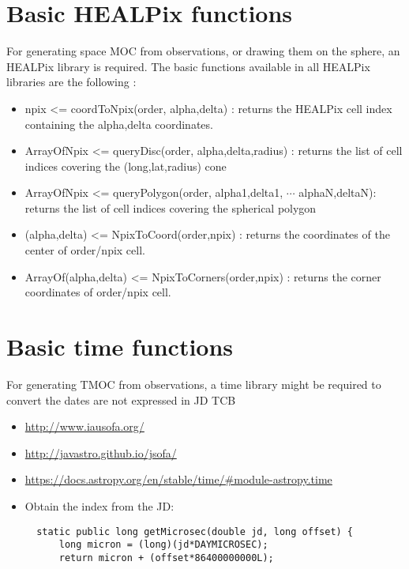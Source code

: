 \section{Basic HEALPix functions}
For generating space MOC from observations, or drawing them on the
sphere, an HEALPix library is required. The basic functions available
in all HEALPix libraries are the following :
\begin{itemize}
   \item npix <= coordToNpix(order, alpha,delta) : returns the HEALPix
     cell index containing the alpha,delta coordinates.
   \item ArrayOfNpix <= queryDisc(order, alpha,delta,radius) : returns
     the list of cell indices covering the (long,lat,radius) cone
   \item ArrayOfNpix <= queryPolygon(order, alpha1,delta1, $\cdots$
     alphaN,deltaN): returns the list of cell indices covering the
     spherical polygon
   \item (alpha,delta) <= NpixToCoord(order,npix) : returns the
     coordinates of the center of order/npix cell.
   \item ArrayOf(alpha,delta) <= NpixToCorners(order,npix) : returns
     the corner coordinates of order/npix cell.
\end{itemize}

\section{Basic time functions} 
For generating TMOC from observations, a time library might be required to convert the dates are not expressed in JD TCB
\begin{itemize} 
\item \url{http://www.iausofa.org/}
\item \url{http://javastro.github.io/jsofa/}
\item \url{https://docs.astropy.org/en/stable/time/#module-astropy.time}
\item Obtain the index from the JD: 
\begin{Verbatim}
  static public long getMicrosec(double jd, long offset) {
      long micron = (long)(jd*DAYMICROSEC);
      return micron + (offset*86400000000L);
\end{Verbatim}
\end{itemize} 
